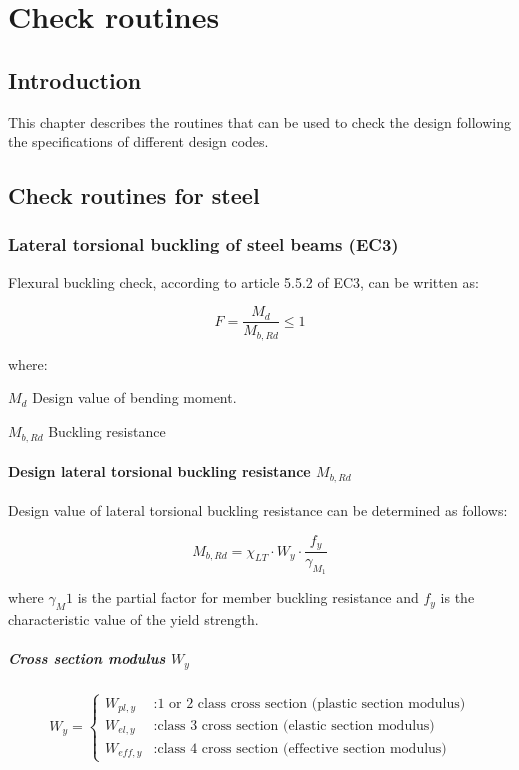 \chapter{Check routines}
\section{Introduction}
This chapter describes the routines that can be used to check the design following the specifications of different design codes.

\section{Check routines for steel}

\subsection{Lateral torsional buckling of steel beams (EC3)}
Flexural buckling check, according to article 5.5.2 of EC3, can be written as:

\begin{equation}
F= \frac{M_d}{M_{b,Rd}} \leq 1
\end{equation}   

\noindent where:
\begin{description}
\item{$M_d$} Design value of bending moment.
\item{$M_{b,Rd}$} Buckling resistance
\end{description}

\subsubsection{Design lateral torsional buckling resistance $M_{b,Rd}$}
Design value of lateral torsional buckling resistance can be determined as follows:

\begin{equation}
M_{b,Rd}= \chi_{LT} \cdot W_y \cdot \frac{f_y}{\gamma_{M_1}} 
\end{equation}

\noindent where $\gamma_M1$ is the partial factor for member buckling resistance and $f_y$ is the characteristic value of the yield strength.

\paragraph{Cross section modulus $W_y$}
\begin{equation}
W_y= \left\{
\begin{array}{lr}
W_{pl,y} & : \text{1 or 2 class cross section (plastic section modulus)}\\
W_{el,y} & : \text{class 3 cross section (elastic section modulus)}\\
W_{eff,y} & : \text{class 4 cross section (effective section modulus)}
\end{array}
\right.
\end{equation}

